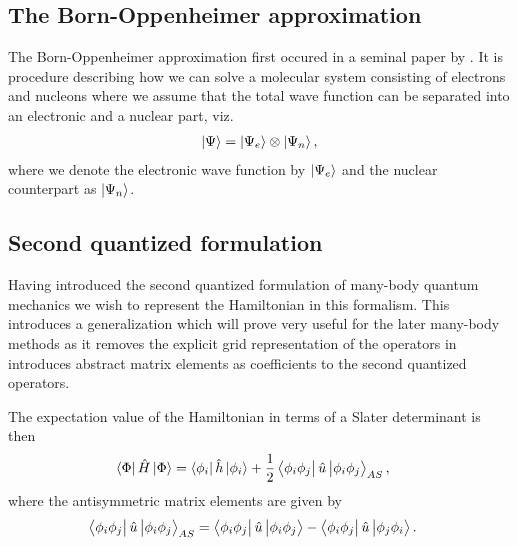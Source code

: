         \subsection{The Born-Oppenheimer approximation}
            The Born-Oppenheimer approximation first occured in a seminal paper
            by \citeauthor{born1927quantentheorie}
            \cite{born1927quantentheorie}.
            It is procedure describing how we can solve a molecular system
            consisting of electrons and nucleons where we assume that the total
            wave function can be separated into an electronic and a nuclear
            part, viz.
            \begin{align}
                \ket{\Psi} = \ket{\Psi_e}\otimes\ket{\Psi_n},
            \end{align}
            where we denote the electronic wave function by $\ket{\Psi_e}$ and
            the nuclear counterpart as $\ket{\Psi_n}$.

        \subsection{Second quantized formulation}
            Having introduced the second quantized formulation of many-body
            quantum mechanics we wish to represent the Hamiltonian in this
            formalism.
            This introduces a generalization which will prove very useful for
            the later many-body methods as it removes the explicit grid
            representation of the operators in introduces abstract matrix
            elements as coefficients to the second quantized operators.

            The expectation value of the Hamiltonian in terms of a Slater
            determinant is then
            \begin{align}
                \bra{\Phi}\hat{H}\ket{\Phi}
                &= \bra{\phi_i}\hat{h}\ket{\phi_i}
                + \frac{1}{2}\bra{\phi_i\phi_j}\hat{u}\ket{\phi_i\phi_j}_{AS},
            \end{align}
            where the antisymmetric matrix elements are given by
            \begin{align}
                \bra{\phi_i\phi_j}\hat{u}\ket{\phi_i\phi_j}_{AS}
                &= \bra{\phi_i\phi_j}\hat{u}\ket{\phi_i\phi_j}
                - \bra{\phi_i\phi_j}\hat{u}\ket{\phi_j\phi_i}.
                \label{eq:antisymmetric_two_body}
            \end{align}

